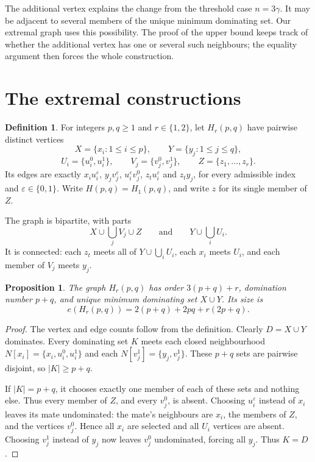 \documentclass[11pt]{article}
\newtheorem{proposition}[theorem]{Proposition}
\theoremstyle{definition}
\newtheorem{definition}[theorem]{Definition}
\theoremstyle{remark}
\newcommand{\e}{e}
\begin{document}
The additional vertex explains the change from the threshold case $n=3\gamma$.
It may be adjacent to several members of the unique minimum dominating set.
Our extremal graph uses this possibility. The proof of the upper bound keeps
track of whether the additional vertex has one or several such neighbours;
the equality argument then forces the whole construction.

\section{The extremal constructions}\label{sec:construction}

\begin{definition}\label{def:H}
For integers $p,q\ge1$ and $r\in\{1,2\}$, let $H_r(p,q)$ have pairwise
 distinct vertices
\[
 X=\{x_i:1\le i\le p\},\qquad Y=\{y_j:1\le j\le q\},
\]
\[
 U_i=\{u_i^0,u_i^1\},\qquad V_j=\{v_j^0,v_j^1\},\qquad
 Z=\{z_1,\ldots,z_r\}.
\]
Its edges are exactly $x_i u_i^\varepsilon$, $y_j v_j^\varepsilon$,
$u_i^\varepsilon v_j^0$, $z_tu_i^\varepsilon$ and $z_ty_j$, for every
admissible index and $\varepsilon\in\{0,1\}$. Write $H(p,q)=H_1(p,q)$,
and write $z$ for its single member of $Z$.
\end{definition}

The graph is bipartite, with parts
\begin{equation}\label{eq:parts}
 X\cup\bigcup_jV_j\cup Z
 \qquad\text{and}\qquad
 Y\cup\bigcup_iU_i.
\end{equation}
It is connected: each $z_t$ meets all of $Y\cup\bigcup_iU_i$, each $x_i$
meets $U_i$, and each member of $V_j$ meets $y_j$.

\begin{proposition}\label{prop:H}
The graph $H_r(p,q)$ has order $3(p+q)+r$, domination number $p+q$, and
unique minimum dominating set $X\cup Y$. Its size is
\begin{equation}\label{eq:Hcount}
 \e(H_r(p,q))=2(p+q)+2pq+r(2p+q).
\end{equation}
\end{proposition}

\begin{proof}
The vertex and edge counts follow from the definition. Clearly
$D=X\cup Y$ dominates. Every dominating set $K$ meets each closed
neighbourhood $N[x_i]=\{x_i,u_i^0,u_i^1\}$ and each
$N[v_j^1]=\{y_j,v_j^1\}$. These $p+q$ sets are pairwise disjoint, so
$|K|\ge p+q$.

If $|K|=p+q$, it chooses exactly one member of each of these sets and
nothing else. Thus every member of $Z$, and every $v_j^0$, is absent.
Choosing $u_i^\varepsilon$ instead of $x_i$ leaves its mate undominated:
the mate's neighbours are $x_i$, the members of $Z$, and the vertices
$v_j^0$. Hence all $x_i$ are selected and all $U_i$ vertices are absent.
Choosing $v_j^1$ instead of $y_j$ now leaves $v_j^0$ undominated, forcing
all $y_j$. Thus $K=D$.
\end{proof}
\end{document}
